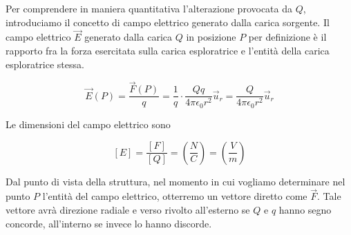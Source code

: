 Per comprendere in maniera quantitativa l'alterazione provocata da $Q$, introduciamo il concetto di campo elettrico generato dalla carica sorgente.
Il campo elettrico $\vec{E} $ generato dalla carica $Q$ in posizione $P$ per definizione è il rapporto fra la forza esercitata sulla carica esploratrice e l'entità della carica esploratrice stessa.

\[
	\vec{E} (P)=\frac{\vec{F} (P)}{q}=\frac{1}{q}\cdot \frac{Qq}{4\pi \epsilon_0 r^2}\vec{u}_r = \frac{Q}{4\pi \epsilon_0 r^2}\vec{u}_r
\]

Le dimensioni del campo elettrico sono

\[
	[E]=\frac{[F]}{[Q]} = \left( \frac{N}{C} \right) = \left( \frac{V}{m} \right)
\]

Dal punto di vista della struttura, nel momento in cui vogliamo determinare nel punto $P$ l'entità del campo elettrico, otterremo un vettore diretto come $\vec{F}$. Tale vettore avrà direzione radiale e verso rivolto all'esterno se $Q$ e $q$ hanno segno concorde, all'interno se invece lo hanno discorde.

